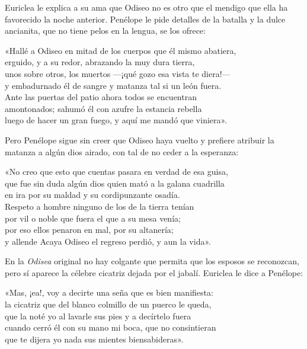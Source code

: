Euriclea le explica a su ama que Odiseo no es otro que el mendigo que ella ha favorecido la noche anterior. Penélope le pide detalles de la batalla y la dulce ancianita, que no tiene pelos en la lengua, se los ofrece:

\begin{versocita}
«Hallé a Odiseo en mitad de los cuerpos que él mismo abatiera,\\
erguido, y a su redor, abrazando la muy dura tierra,\\
unos sobre otros, los muertos ---¡qué gozo esa vista te diera!---\\
y embadurnado él de sangre y matanza tal si un león fuera.\\
Ante las puertas del patio ahora todos se encuentran\\
amontonados; sahumó él con azufre la estancia rebella\\
luego de hacer un gran fuego, y aquí me mandó que viniera».
\end{versocita}

Pero Penélope sigue sin creer que Odiseo haya vuelto y prefiere atribuir la matanza a algún dios airado, con tal de no ceder a la esperanza:

\begin{versocita}
«No creo que esto que cuentas pasara en verdad de esa guisa,\\
que fue sin duda algún dios quien mató a la galana cuadrilla\\
en ira por su maldad y su cordipunzante osadía.\\
Respeto a hombre ninguno de los de la tierra tenían\\
por vil o noble que fuera el que a su mesa venía;\\
por eso ellos penaron en mal, por su altanería;\\
y allende Acaya Odiseo el regreso perdió, y aun la vida».
\end{versocita}

En la \emph{Odisea} original no hay colgante que permita que los esposos se reconozcan, pero sí aparece la célebre cicatriz dejada por el jabalí. Euriclea le dice a Penélope:

\begin{versocita}
«Mas, ¡ea!, voy a decirte una seña que es bien manifiesta:\\
la cicatriz que del blanco colmillo de un puerco le queda,\\
que la noté yo al lavarle sus pies y a decírtelo fuera\\
cuando cerró él con su mano mi boca, que no consintieran\\
que te dijera yo nada sus mientes biensabideras».
\end{versocita}

